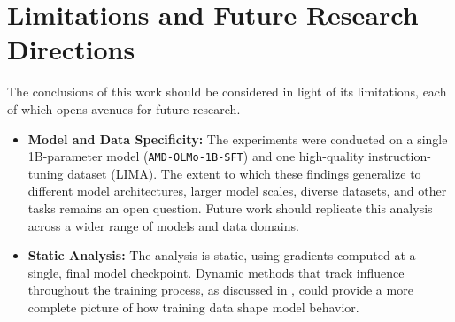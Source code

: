 \section{Limitations and Future Research Directions}
The conclusions of this work should be considered in light of its limitations, each of which opens avenues for future research.
\begin{itemize}
    \item \textbf{Model and Data Specificity:} The experiments were conducted on a single 1B-parameter model (\texttt{AMD-OLMo-1B-SFT}) and one high-quality instruction-tuning dataset (LIMA). The extent to which these findings generalize to different model architectures, larger model scales, diverse datasets, and other tasks remains an open question. Future work should replicate this analysis across a wider range of models and data domains.
    
    \item \textbf{Static Analysis:} The analysis is static, using gradients computed at a single, final model checkpoint. Dynamic methods that track influence throughout the training process, as discussed in , could provide a more complete picture of how training data shape model behavior.
\end{itemize}
